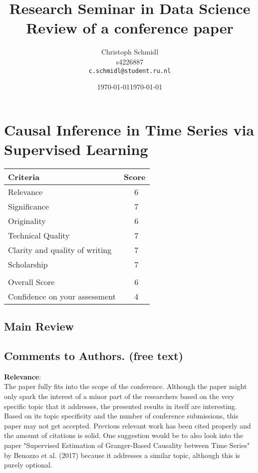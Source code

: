 \documentclass[a4paper]{article}
\title{Research Seminar in Data Science\\Review of a conference paper}
\author{
  Christoph Schmidl\\ s4226887\\      \texttt{c.schmidl@student.ru.nl}
}
\date{\today}
\date{\today}
\begin{document}
\maketitle





\section{Causal Inference in Time Series via Supervised Learning}

\setlength{\tabcolsep}{0.5em} %
{\renewcommand{\arraystretch}{1.2}%
\begin{table}[h]
\centering
    \begin{tabular}{|l|l|}
    \hline
    \textbf{Criteria} & \textbf{Score} \\ \hline
    Relevance & ~~ 6\\ \hline
    Significance & ~~ 7\\ \hline
    Originality & ~~ 6\\ \hline
    Technical Quality & ~~ 7\\ \hline
    Clarity and quality of writing & ~~ 7\\ \hline
    Scholarship & ~~ 7\\ \hline
     & \\ \hline
    Overall Score & ~~ 6 \\ \hline
    Confidence on your assessment & ~~ 4 \\ \hline
    \end{tabular}
\end{table}





\subsection{Main Review}

\subsection{Comments to Authors. (free text)}

\textbf{Relevance}:\\

The paper fully fits into the scope of the conference. Although the paper might only spark the interest of a minor part of the researchers based on the very specific topic that it addresses, the presented results in itself are interesting. Based on its topic specificity and the number of conference submissions, this paper may not get accepted. Previous relevant work has been cited properly and the amount of citations is solid. One suggestion would be to also look into the paper "Supervised Estimation of Granger-Based Causality between Time Series" by Benozzo et al. (2017) because it addresses a similar topic, although this is purely optional.\\

}
\end{document}
